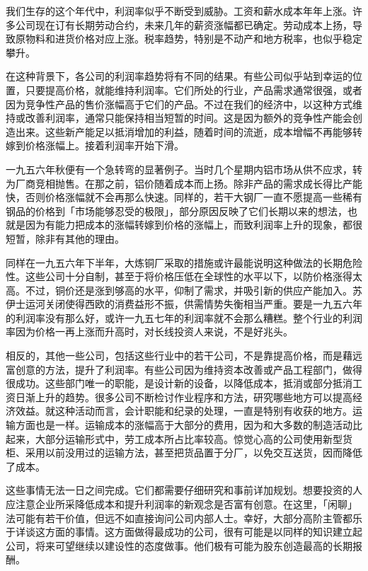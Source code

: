 \documentclass[UTF8,a4paper,zihao=-4,fontset = windows]{ctexart} %
\begin{document}
我们生存的这个年代中，利润率似乎不断受到威胁。工资和薪水成本年年上涨。许多公司现在订有长期劳动合约，未来几年的薪资涨幅都已确定。劳动成本上扬，导致原物料和进货价格对应上涨。税率趋势，特别是不动产和地方税率，也似乎稳定攀升。

在这种背景下，各公司的利润率趋势将有不同的结果。有些公司似乎站到幸运的位置，只要提高价格，就能维持利润率。它们所处的行业，产品需求通常很强，或者因为竞争性产品的售价涨幅高于它们的产品。不过在我们的经济中，以这种方式维持或改善利润率，通常只能保持相当短暂的时间。这是因为额外的竞争性产能会创造出来。这些新产能足以抵消增加的利益，随着时间的流逝，成本增幅不再能够转嫁到价格涨幅上。接着利润率开始下滑。

一九五六年秋便有一个急转弯的显著例子。当时几个星期内铝市场从供不应求，转为厂商竞相抛售。在那之前，铝价随着成本而上扬。除非产品的需求成长得比产能快，否则价格涨幅就不会再那么快速。同样的，若干大钢厂一直不愿提高一些稀有钢品的价格到「市场能够忍受的极限」，部分原因反映了它们长期以来的想法，也就是因为有能力把成本的涨幅转嫁到价格的涨幅上，而致利润率上升的现象，都很短暂，除非有其他的理由。

同样在一九五六年下半年，大炼铜厂采取的措施或许最能说明这种做法的长期危险性。这些公司十分自制，甚至于将价格压低在全球性的水平以下，以防价格涨得太高。不过，铜价还是涨到够高的水平，仰制了需求，并吸引新的供应产能加入。苏伊士运河关闭使得西欧的消费益形不振，供需情势失衡相当严重。要是一九五六年的利润率没有那么好，或许一九五七年的利润率就不会那么糟糕。整个行业的利润率因为价格一再上涨而升高时，对长线投资人来说，不是好兆头。

相反的，其他一些公司，包括这些行业中的若干公司，不是靠提高价格，而是藉远富创意的方法，提升了利润率。有些公司因为维持资本改善或产品工程部门，做得很成功。这些部门唯一的职能，是设计新的设备，以降低成本，抵消或部分抵消工资日渐上升的趋势。很多公司不断检讨作业程序和方法，研究哪些地方可以提高经济效益。就这种活动而言，会计职能和纪录的处理，一直是特别有收获的地方。运输方面也是一样。运输成本的涨幅高于大部分的费用，因为和大多数的制造活动比起来，大部分运输形式中，劳工成本所占比率较高。惊觉心高的公司使用新型货柜、采用以前没用过的运输方法，甚至把货品置于分厂，以免交互送货，因而降低了成本。

这些事情无法一日之间完成。它们都需要仔细研究和事前详加规划。想要投资的人应注意企业所采降低成本和提升利润率的新观念是否富有创意。在这里，「闲聊」法可能有若干价值，但远不如直接询问公司内部人士。幸好，大部分高阶主管都乐于详谈这方面的事情。这方面做得最成功的公司，很有可能是以同样的知识建立起公司，将来可望继续以建设性的态度做事。他们极有可能为股东创造最高的长期报酬。
\\
\end{document}
